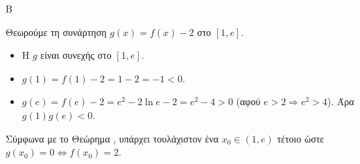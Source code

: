 \begin{thema}{Β}
\begin{erwthma}
\item Θεωρούμε τη συνάρτηση $g(x) = f(x) - 2$ στο $[1, e]$.
\begin{itemize}
\item Η $g$ είναι συνεχής στο $[1, e]$.
\item $g(1) = f(1) - 2 = 1 - 2 = -1 < 0$.
\item $g(e) = f(e) - 2 = e^2 - 2\ln e - 2 = e^2 - 4 > 0$ (αφού $e > 2 \Rightarrow e^2 > 4$).
Άρα $g(1)g(e) < 0$.
\end{itemize}
Σύμφωνα με το Θεώρημα , υπάρχει τουλάχιστον ένα $x_0 \in (1, e)$ τέτοιο ώστε $g(x_0) = 0 \Leftrightarrow f(x_0) = 2$.
\end{erwthma}
\end{thema}

